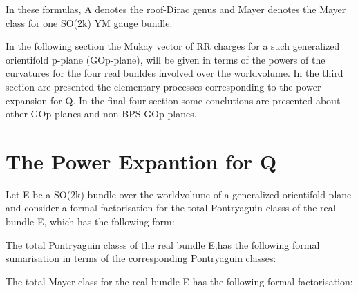 \documentclass[a4paper,a4paper]{article}
\begin{document}
In these formulas, A denotes the roof-Dirac genus and Mayer denotes the Mayer class for one SO(2k) YM gauge bundle.

In the following section the Mukay vector of RR charges for a such generalized orientifold p-plane (GOp-plane), will be given in terms of the powers of the curvatures for the four real bunldes involved over the worldvolume.  In the third section are presented the elementary processes corresponding to the power expansion for Q. In the final four section some conclutions are presented about other GOp-planes and non-BPS GOp-planes.

\section{The Power Expantion for Q}

Let E be a SO(2k)-bundle over the worldvolume of a generalized orientifold plane and consider a formal factorisation for the total Pontryaguin classs of the real bundle E, which has the following form:

\begin{center}
{  \coordHE{} }
\end{center}
The total Pontryaguin classs of the real bundle E,has the following formal sumarisation in terms of the corresponding Pontryaguin classes: 
\begin{center}
{  \coordHE{} }
\end{center}
The total Mayer class for the real bundle E has the following formal factorisation:
\begin{center}
{  \coordHE{} }
\end{center}
\end{document}
